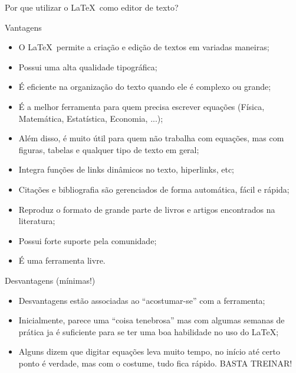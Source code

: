 \documentclass[c]{beamer}
\begin{document}
{    \begin{frame}[standout]
        
        Por que utilizar o \LaTeX \ como editor de texto?
        
    \end{frame}

    \begin{frame}[fragile]{\sc Vantagens}
        
	    \begin{itemize}
        \setlength\itemsep{0.2cm}
            
		    \item O \LaTeX\ permite a {\color{blue} criação} e {\color{blue} edição} de textos em variadas maneiras;
		    \item Possui uma alta {\color{blue} qualidade tipográfica};
		    \item É eficiente na {\color{blue} organização do texto} quando ele é complexo ou grande;
		    \item É a melhor ferramenta para quem precisa {\color{blue} escrever equações} (Física, Matemática, Estatística, Economia, ...);
		    \item Além disso, é muito útil para quem não trabalha com equações, mas com {\color{blue} figuras}, {\color{blue} tabelas} e qualquer tipo de {\color{blue} texto em geral};
		    \item Integra funções de {\color{blue} links dinâmicos} no texto, hiperlinks, etc;
		    \item {\color{blue} Citações} e {\color{blue} bibliografia} são gerenciados de forma automática, fácil e rápida;
		    \item Reproduz o formato de grande parte de livros e artigos encontrados na literatura;
		    \item Possui forte {\color{blue} suporte pela comunidade};
		    \item É uma {\color{blue} ferramenta livre}.
		    
	    \end{itemize}
	    
    \end{frame}
    
    \begin{frame}[fragile]{\sc Desvantagens (mínimas!)}
        
	    \begin{itemize}
	    \setlength\itemsep{0.5cm}
	        \item Desvantagens estão associadas ao ``acostumar-se'' com a ferramenta;
	        \item Inicialmente, parece uma ``coisa tenebrosa'' mas com  algumas semanas de prática ja é suficiente para se ter uma boa habilidade no uso do \LaTeX;
	        \item Alguns dizem que digitar equações leva muito tempo, no início até certo ponto é verdade, mas com o costume, tudo fica rápido. BASTA TREINAR!
	    \end{itemize}
	    

\end{frame}}
\end{document}
